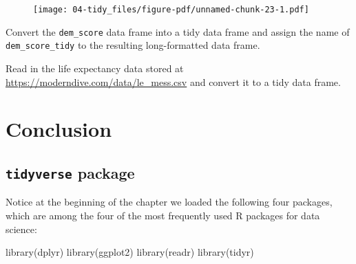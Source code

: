 \documentclass[
  letterpaper,
  DIV=11,
  numbers=noendperiod]{scrreprt}
\newenvironment{Shaded}{\begin{snugshade}}{\end{snugshade}}
\newcommand{\FunctionTok}[1]{\textcolor[rgb]{0.28,0.35,0.67}{#1}}
\newcommand{\NormalTok}[1]{\textcolor[rgb]{0.00,0.23,0.31}{#1}}
\theoremstyle{definition}
\theoremstyle{remark}
\begin{document}
\begin{figure}[H]

{\centering \texttt{[image: 04-tidy\_files/figure-pdf/unnamed-chunk-23-1.pdf]}

}

\end{figure}

\begin{tcolorbox}[enhanced jigsaw, coltitle=black, toprule=.15mm, bottomtitle=1mm, breakable, leftrule=.75mm, title={{🎯} Learning Check 4.4}, opacitybacktitle=0.6, colback=white, rightrule=.15mm, opacityback=0, toptitle=1mm, colbacktitle=quarto-callout-tip-color!10!white, colframe=quarto-callout-tip-color-frame, titlerule=0mm, arc=.35mm, bottomrule=.15mm, left=2mm]
Convert the \texttt{dem\_score} data frame into a tidy data frame and
assign the name of \texttt{dem\_score\_tidy} to the resulting
long-formatted data frame.
\end{tcolorbox}

\begin{tcolorbox}[enhanced jigsaw, coltitle=black, toprule=.15mm, bottomtitle=1mm, breakable, leftrule=.75mm, title={{🎯} Learning Check 4.5}, opacitybacktitle=0.6, colback=white, rightrule=.15mm, opacityback=0, toptitle=1mm, colbacktitle=quarto-callout-tip-color!10!white, colframe=quarto-callout-tip-color-frame, titlerule=0mm, arc=.35mm, bottomrule=.15mm, left=2mm]
Read in the life expectancy data stored at
\url{https://moderndive.com/data/le_mess.csv} and convert it to a tidy
data frame.
\end{tcolorbox}

\hypertarget{tidy-conclusion}{%
\section{Conclusion}\label{tidy-conclusion}}

\hypertarget{sec-tidyverse-package}{%
\subsection{\texorpdfstring{\texttt{tidyverse}
package}{tidyverse package}}\label{sec-tidyverse-package}}

Notice at the beginning of the chapter we loaded the following four
packages, which are among the four of the most frequently used R
packages for data science:

\begin{Shaded}
\begin{Highlighting}[]
\FunctionTok{library}\NormalTok{(dplyr)}
\FunctionTok{library}\NormalTok{(ggplot2)}
\FunctionTok{library}\NormalTok{(readr)}
\FunctionTok{library}\NormalTok{(tidyr)}
\end{Highlighting}
\end{Shaded}
\end{document}
